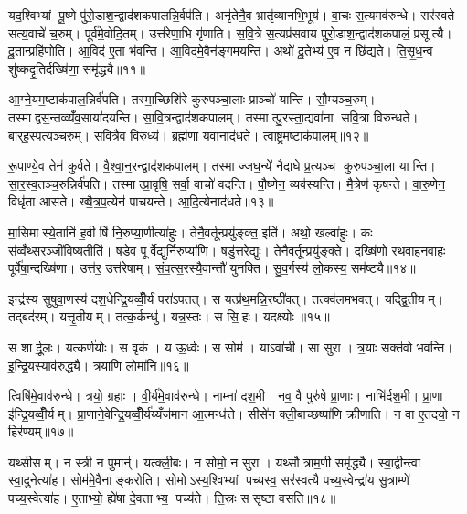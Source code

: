 यद॒श्विभ्यां पू॒ष्णे पु॑रो॒डाश॒न्द्वाद॑शकपालन्नि॒र्वप॑ति। अनृ॑तेनै॒व भ्रातृ॑व्यानभि॒भूय॑। वा॒चः स॒त्यमव॑रुन्धे। सर॑स्वते सत्य॒वाचे॑ च॒रुम्। पूर्व॑मे॒वोदि॒तम्। उत्त॑रेणा॒भि गृ॑णाति। स॒वि॒त्रे स॒त्यप्र॑सवाय पुरो॒डाश॒न्द्वाद॑शकपालं॒ प्रसूत्यै। दू॒तान्प्रहि॑णोति। आ॒विद॑ ए॒ता भ॑वन्ति। आ॒विद॑मे॒वैन॑ङ्गमयन्ति। अथो॑ दू॒तेभ्य॑ ए॒व न छि॑द्यते। ति॒सृ॒ध॒न्व शु॑ष्कदृ॒तिर्दख्षि॑णा॒ समृ॑द्ध्यै॥११॥\anuvakamend[अ॒र्ध॒य॒ति॒ भ॒व॒त्य॒रु॒न्ध॒त॒ ग॒म॒य॒न्ति॒ द्वे च॑]

आ॒ग्ने॒यम॒ष्टाक॑पाल॒न्निर्व॑पति। तस्मा॒च्छिशि॑रे कुरुपञ्चा॒लाः प्राञ्चो॑ यान्ति। सौ॒म्यञ्च॒रुम्। तस्माद्वस॒न्तव्व्यँ॑व॒साया॑दयन्ति। सा॒वि॒त्रन्द्वाद॑शकपालम्। तस्मात्पु॒रस्ता॒द्यवा॑ना सवि॒त्रा विरु॑न्धते। बा॒र्॒ह॒स्प॒त्यञ्च॒रुम्। स॒वि॒त्रैव वि॒रुध्य॑। ब्रह्म॑णा॒ यवा॒नाद॑धते। त्वा॒ष्ट्रम॒ष्टाक॑पालम्॥१२॥

रू॒पाण्ये॒व तेन॑ कुर्वते। वै॒श्वा॒न॒रन्द्वाद॑शकपालम्। तस्माज्जघ॒न्ये॑ नैदा॑घे प्र॒त्यञ्च॑ कुरुपञ्चा॒ला यान्ति। सा॒र॒स्व॒तञ्च॒रुन्निर्व॑पति। तस्मात्प्रा॒वृषि॒ सर्वा॒ वाचो॑ वदन्ति। पौ॒ष्णेन॒ व्यव॑स्यन्ति। मै॒त्रेण॑ कृषन्ते। वा॒रु॒णेन॒ विधृ॑ता आसते। ख्षै॒त्र॒प॒त्येन॑ पाचयन्ते। आ॒दि॒त्येनाद॑धते॥१३॥

मा॒सिमास्ये॒तानि॑ ह॒वीषि॑ नि॒रुप्या॒णीत्या॑हुः। तेनै॒वर्तून्प्रयु॑ङ्क्त॒ इति॑। अथो॒ खल्वा॑हुः। कः स॑व्वँथ्स॒रञ्जी॑विष्य॒तीति॑। षडे॒व पूर्वे॒द्युर्नि॒रुप्या॑णि। षडु॑त्तरे॒द्युः। तेनै॒वर्तून्प्रयु॑ङ्क्ते। दख्षि॑णो रथवाहनवा॒हः पूर्वे॑षा॒न्दख्षि॑णा। उत्त॑र॒ उत्त॑रेषाम्। सं॒व॒त्स॒रस्यै॒वान्तौ॑ युनक्ति। सु॒व॒र्गस्य॑ लो॒कस्य॒ सम॑ष्ट्यै॥१४॥\anuvakamend[त्वा॒ष्ट्रम॒ष्टाक॑पालन्दधते युन॒क्त्येक॑ञ्च]

इन्द्र॑स्य सुषुवा॒णस्य॑ दश॒धेन्द्रि॒यव्वीँ॒र्यं॑ परा॑ऽपतत्। स यत्प्र॑थ॒मन्नि॒रष्ठी॑वत्। तत्क्व॑लमभवत्। यद्द्वि॒तीयम्। तद्बद॑रम्। यत्तृ॒तीयम्। तत्क॒र्कन्धु॑। यन्न॒स्तः। स सि॒हः। यदक्ष्योः॥१५॥

स शार्दू॒लः। यत्कर्ण॑योः। स वृक॑। य ऊ॒र्ध्वः। स सोम॑। याऽवा॑ची। सा सुरा। त्र॒याः सक्त॑वो भवन्ति। इ॒न्द्रि॒यस्याव॑रुद्ध्यै। त्र॒याणि॒ लोमा॑नि॥१६॥

त्विषि॑मे॒वाव॑रुन्धे। त्रयो॒ ग्रहाः। वी॒र्य॑मे॒वाव॑रुन्धे। नाम्ना॑ दश॒मी। नव॒ वै पुरु॑षे प्रा॒णाः। नाभि॑र्दश॒मी। प्रा॒णा इ॑न्द्रि॒यव्वीँ॒र्यम्। प्रा॒णाने॒वेन्द्रि॒यव्वीँ॒र्य॑य्यँज॑मान आ॒त्मन्ध॑त्ते। सीसे॑न क्ली॒बाच्छष्पा॑णि क्रीणाति। न वा ए॒तदयो॒ न हिर॑ण्यम्॥१७॥

यथ्सीसम्। न स्त्री न पुमान्॑। यत्क्ली॒बः। न सोमो॒ न सुरा। यथ्सौत्राम॒णी समृ॑द्ध्यै। स्वा॒द्वीन्त्वा स्वा॒दुनेत्या॑ह। सोम॑मे॒वैनाङ्करोति। सोमोऽस्य॒श्विभ्यां पच्यस्व॒ सर॑स्वत्यै पच्य॒स्वेन्द्रा॑य सु॒त्राम्णे॑ पच्य॒स्वेत्या॑ह। ए॒ताभ्यो॒ ह्ये॑षा दे॒वताभ्य॒ पच्य॑ते। ति॒स्रः ससृ॑ष्टा वसति॥१८॥

